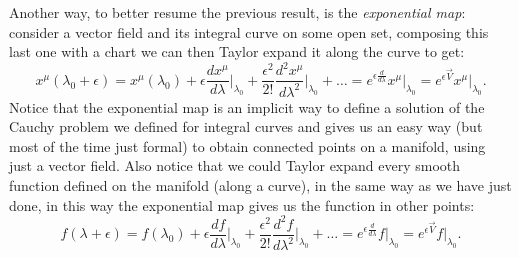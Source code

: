 Another way, to better resume the previous result, is the \emph{exponential map}: consider a vector field and its integral curve on some open set, composing this last one with a chart we can then Taylor expand it along the curve to get:
$$x^\mu(\lambda_0+\epsilon)= x^\mu(\lambda_0)+\epsilon\frac{dx^\mu}{d\lambda}\bigg|_{\lambda_0}+\frac{\epsilon^2}{2!}\frac{d^2x^\mu}{d\lambda^2}\bigg|_{\lambda_0}+\dots=e^{\epsilon \frac{d}{d\lambda}}x^\mu\big|_{\lambda_0}=e^{\epsilon \vec V}x^\mu\big|_{\lambda_0}.$$
Notice that the exponential map is an implicit way to define a solution of the Cauchy problem we defined for integral curves and gives us an easy way (but most of the time just formal) to obtain connected points on a manifold, using just a vector field. Also notice that we could Taylor expand every smooth function defined on the manifold (along a curve), in the same way as we have just done, in this way the exponential map gives us the function in other points:$$\boxed{f(\lambda+\epsilon)=f(\lambda_0)+\epsilon\frac{df}{d\lambda}\bigg|_{\lambda_0}+\frac{\epsilon^2}{2!}\frac{d^2f}{d\lambda^2}\bigg|_{\lambda_0}+\dots=e^{\epsilon \frac{d}{d\lambda}}f\big|_{\lambda_0}=e^{\epsilon \vec V}f\big|_{\lambda_0}}.$$

